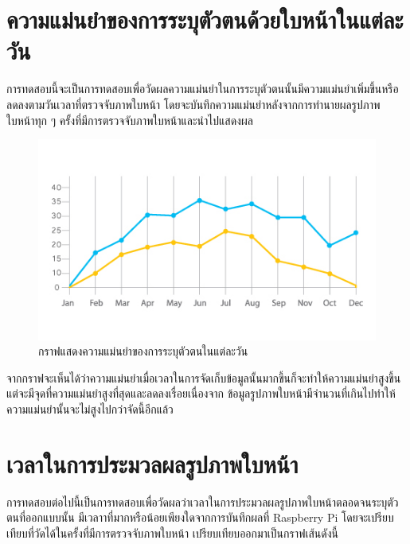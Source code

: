 \section{ความแม่นยำของการระบุตัวตนด้วยใบหน้าในแต่ละวัน}
การทดสอบนี้จะเป็นการทดสอบเพื่อวัดผลความแม่นยำในการระบุตัวตนนั้นมีความแม่นยำเพิ่มขึ้นหรือลดลงตามวันเวลาที่ตรวจจับภาพใบหน้า
โดยจะบันทึกความแม่นยำหลังจากการทำนายผลรูปภาพใบหน้าทุก ๆ ครั้งที่มีการตรวจจับภาพใบหน้าและนำไปแสดงผล

\begin{figure}[!ht]
    \begin{center}
      \includegraphics[scale=.6]{pic/graph_acc.jpg}
      \caption[กราฟแสดงความแม่นยำของการระบุตัวตนในแต่ละวัน]{กราฟแสดงความแม่นยำของการระบุตัวตนในแต่ละวัน}
      \label{fig:face_graph}
    \end{center}
  \end{figure}

\indent จากกราฟจะเห็นได้ว่าความแม่นยำเมื่อเวลาในการจัดเก็บข้อมูลนั้นมากขึ้นก็จะทำให้ความแม่นยำสูงขึ้น แต่จะมีจุดที่ความแม่นยำสูงที่สุดและลดลงเรื่อยเนื่องจาก
ข้อมูลรูปภาพใบหน้ามีจำนวนที่เกินไปทำให้ความแม่นยำนั้นจะไม่สูงไปกว่าจัดนี้อีกแล้ว

\section{เวลาในการประมวลผลรูปภาพใบหน้า}
การทดสอบต่อไปนี้เป็นการทดสอบเพื่อวัดผลว่าเวลาในการประมวลผลรูปภาพใบหน้าตลอดจนระบุตัวตนที่ออกแบบนั้น
มีเวลาาที่มากหรือน้อยเพียงใดจากการบันทึกผลที่ Raspberry Pi โดยจะเปรียบเทียบที่วัดได้ในครั้งที่มีการตรวจจับภาพใบหน้า
เปรียบเทียบออกมาเป็นกราฟเส้นดังนี้
  
